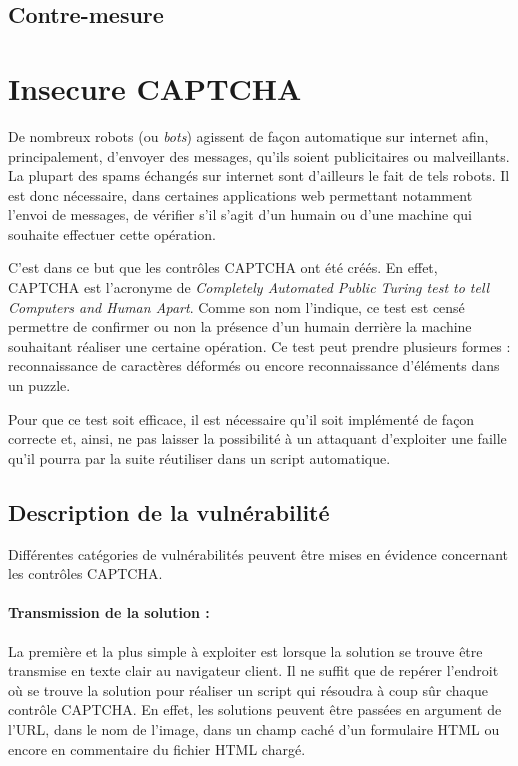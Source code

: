 \subsection{Contre-mesure}

\section{Insecure CAPTCHA}

De nombreux robots (ou \textit{bots}) agissent de façon automatique sur internet afin, principalement, d'envoyer des messages, qu'ils soient publicitaires ou malveillants. La plupart des spams échangés sur internet sont d'ailleurs le fait de tels robots. Il est donc nécessaire, dans certaines applications web permettant notamment l'envoi de messages, de vérifier s'il s'agit d'un humain ou d'une machine qui souhaite effectuer cette opération.

C'est dans ce but que les contrôles CAPTCHA ont été créés. En effet, CAPTCHA est l'acronyme de \textit{Completely Automated Public Turing test to tell Computers and Human Apart}. Comme son nom l'indique, ce test est censé permettre de confirmer ou non la présence d'un humain derrière la machine souhaitant réaliser une certaine opération. Ce test peut prendre plusieurs formes : reconnaissance de caractères déformés ou encore reconnaissance d'éléments dans un puzzle.

Pour que ce test soit efficace, il est nécessaire qu'il soit implémenté de façon correcte et, ainsi, ne pas laisser la possibilité à un attaquant d'exploiter une faille qu'il pourra par la suite réutiliser dans un script automatique.
 

\subsection{Description de la vulnérabilité}

Différentes catégories de vulnérabilités peuvent être mises en évidence concernant les contrôles CAPTCHA.

\paragraph{Transmission de la solution :}

La première et la plus simple à exploiter est lorsque la solution se trouve être transmise en texte clair au navigateur client. Il ne suffit que de repérer l'endroit où se trouve la solution pour réaliser un script qui résoudra à coup sûr chaque contrôle CAPTCHA. En effet, les solutions peuvent être passées en argument de l'URL, dans le nom de l'image, dans un champ caché d'un formulaire HTML ou encore en commentaire du fichier HTML chargé. 

